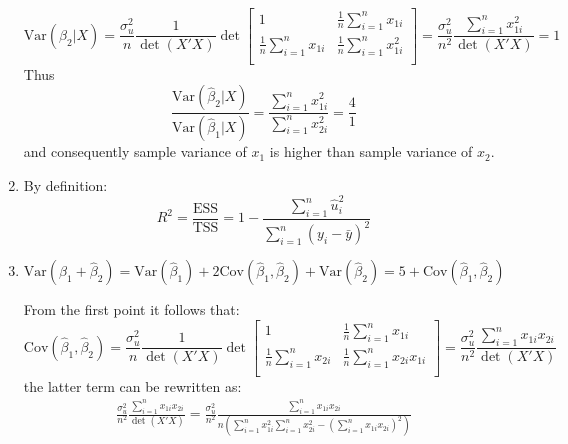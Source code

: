 \documentclass[10pt,a4paper]{amsart}
\newcommand{\V}{\text{Var}}
\newcommand{\C}{\text{Cov}}
\begin{document}
\begin{enumerate}
            \[
                  \V (\hat\beta_2 | X) = \frac{\sigma^{2}_u}{n} \frac{1}{\det (X'X)} \det \begin{bmatrix*}
                        1 & \frac{1}{n}\sum_{i=1}^{n} x_{1i} \\
                        \frac{1}{n}\sum_{i=1}^{n} x_{1i} & \frac{1}{n}\sum_{i=1}^{n} x_{1i}^{2} \\
                  \end{bmatrix*} = \frac{\sigma^{2}_u}{n^{2}} \frac{\sum_{i=1}^{n} x_{1i}^{2}}{\det(X'X)} = 1
            \]
            Thus
            \[
                  \frac{\V (\hat\beta_2 | X)}{\V (\hat\beta_1 | X)} = \frac{\sum_{i=1}^{n} x_{1i}^{2}}{\sum_{i=1}^{n} x_{2i}^{2}} =
                  \frac{4}{1}
            \]
            and consequently sample variance of $ x_1 $ is higher than sample variance of $ x_2 $.
      \item By definition:
            \[
                  R^{2} = \frac{\text{ESS}}{\text{TSS}} = 1 -  \frac{\sum_{i=1}^{n} \hat{u}_i^{2}}{\sum_{i=1}^{n} (y_i - \bar{y})^{2}}
            \]
      \item $ \V (\hat\beta_1 + \hat{\beta}_2) = \V(\hat\beta_1) + 2\C (\hat{\beta}_1, \hat{\beta}_2) + \V(\hat\beta_2) = 5 + \C (\hat{\beta}_1, \hat{\beta}_2)$

            From the first point it follows that:
            \[
                  \C (\hat\beta_1, \hat\beta_2) = \frac{\sigma^{2}_u}{n} \frac{1}{\det(X'X)}
                  \det \begin{bmatrix*}
                        1 & \frac{1}{n}\sum_{i=1}^{n} x_{1i} \\
                        \frac{1}{n}\sum_{i=1}^{n} x_{2i} & \frac{1}{n}\sum_{i=1}^{n} x_{2i}x_{1i} \\
                  \end{bmatrix*} =
                  \frac{\sigma^{2}_u}{n^{2}} \frac{\sum_{i=1}^{n} x_{1i}x_{2i}}{\det(X'X)}
            \]
            the latter term can be rewritten as:
            \begin{gather*}
                  \frac{\sigma^{2}_u}{n^{2}} \frac{\sum_{i=1}^{n} x_{1i}x_{2i}}{\det(X'X)}
                  =\frac{\sigma^{2}_u}{n^{2}} \frac{\sum_{i=1}^{n} x_{1i}x_{2i}}{n(\sum_{i=1}^{n} x_{1i}^{2} \sum_{i=1}^{n} x_{2i}^{2} - (\sum_{i=1}^{n} x_{1i}x_{2i})^{2})}
            \end{gather*}
\end{enumerate}
\end{document}
